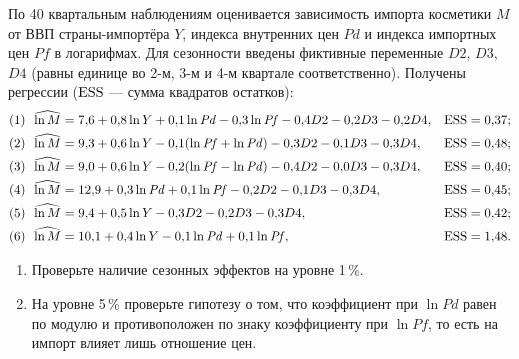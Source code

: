 По 40 квартальным наблюдениям оценивается зависимость импорта косметики $M$
от ВВП страны-импортёра $Y$, индекса внутренних цен $\mathit{Pd}$ и индекса
импортных цен $\mathit{Pf}$ в логарифмах. Для сезонности введены фиктивные
переменные $D2$, $D3$, $D4$ (равны единице во 2-м, 3-м и 4-м квартале
соответственно). Получены регрессии ($\mathrm{ESS}$ — сумма квадратов остатков):
\[
\begin{aligned}
  (1)\ \ & \widehat{\ln M} = 7{,}6 + 0{,}8\ln Y + 0{,}1\ln\mathit{Pd} - 0{,}3\ln\mathit{Pf}
           - 0{,}4D2 - 0{,}2D3 - 0{,}2D4, && \mathrm{ESS} = 0{,}37; \\
  (2)\ \ & \widehat{\ln M} = 9{,}3 + 0{,}6\ln Y - 0{,}1(\ln\mathit{Pf} + \ln\mathit{Pd})
           - 0{,}3D2 - 0{,}1D3 - 0{,}3D4, && \mathrm{ESS} = 0{,}48; \\
  (3)\ \ & \widehat{\ln M} = 9{,}0 + 0{,}6\ln Y - 0{,}2(\ln\mathit{Pf} - \ln\mathit{Pd})
           - 0{,}4D2 - 0{,}0D3 - 0{,}3D4, && \mathrm{ESS} = 0{,}40; \\
  (4)\ \ & \widehat{\ln M} = 12{,}9 + 0{,}3\ln\mathit{Pd} + 0{,}1\ln\mathit{Pf}
           - 0{,}2D2 - 0{,}1D3 - 0{,}3D4, && \mathrm{ESS} = 0{,}45; \\
  (5)\ \ & \widehat{\ln M} = 9{,}4 + 0{,}5\ln Y - 0{,}3D2 - 0{,}2D3 - 0{,}3D4, && \mathrm{ESS} = 0{,}42; \\
  (6)\ \ & \widehat{\ln M} = 10{,}1 + 0{,}4\ln Y - 0{,}1\ln\mathit{Pd} + 0{,}1\ln\mathit{Pf}, && \mathrm{ESS} = 1{,}48 .
\end{aligned}
\]
\begin{enumerate}[label=\asbuk*), leftmargin=2.2em, itemsep=3pt]
  \item Проверьте наличие сезонных эффектов на уровне 1\,\%.
  \item На уровне 5\,\% проверьте гипотезу о том, что коэффициент при
        $\ln\mathit{Pd}$ равен по модулю и противоположен по знаку коэффициенту
        при $\ln\mathit{Pf}$, то есть на импорт влияет лишь отношение цен.
\end{enumerate}

